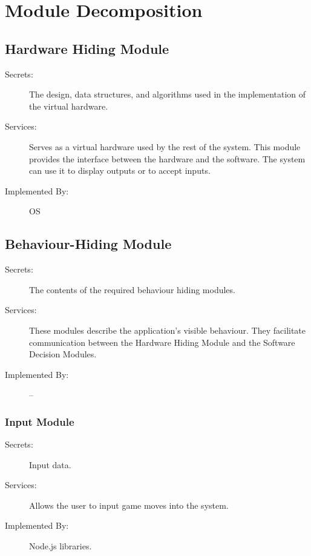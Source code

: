 \documentclass[12pt, titlepage]{article}
\begin{document}
\section{Module Decomposition} \label{SecMD}

\subsection{Hardware Hiding Module \label{mHH}}

\begin{description}
\item[Secrets:] The design, data structures, and algorithms used in the implementation of the virtual hardware.
\item[Services:] Serves as a virtual hardware used by the rest of the system. This module provides the interface between the hardware and the software. The system can use it to display outputs or to accept inputs.
\item[Implemented By:] OS
\end{description}

\subsection{Behaviour-Hiding Module \label{mBH}}

\begin{description}
\item[Secrets:] The contents of the required behaviour hiding modules.
\item[Services:] These modules describe the application's visible behaviour. They facilitate communication between the Hardware Hiding Module and the Software Decision Modules.
\item[Implemented By:] --
\end{description}

    \subsubsection{Input Module \label{mInput}}
    \begin{description}
    \item[Secrets:] Input data.
    \item[Services:] Allows the user to input game moves into the system.
    \item[Implemented By:] Node.js libraries.
    \end{description}
    
\end{document}
